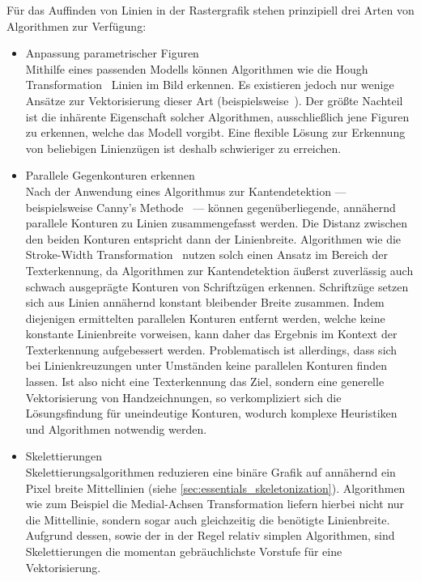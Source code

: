 \clearpage
Für das Auffinden von Linien in der Rastergrafik stehen prinzipiell drei Arten von Algorithmen zur Verfügung:
\begin{itemize}
    \item Anpassung parametrischer Figuren \\
    Mithilfe eines passenden Modells können Algorithmen wie die Hough Transformation~\cite{DBLP:journals/cacm/DudaH72} Linien im Bild erkennen.
    Es existieren jedoch nur wenige Ansätze zur Vektorisierung dieser Art (beispielsweise~\cite{DBLP:journals/pr/SongL05}).
    Der größte Nachteil ist die inhärente Eigenschaft solcher Algorithmen, ausschließlich jene Figuren zu erkennen, welche das Modell vorgibt.
    Eine flexible Lösung zur Erkennung von beliebigen Linienzügen ist deshalb schwieriger zu erreichen.
    \item Parallele Gegenkonturen erkennen \\
    Nach der Anwendung eines Algorithmus zur Kantendetektion --- beispielsweise Canny's Methode~\cite{DBLP:journals/pami/Canny86a} --- können gegenüberliegende, annähernd parallele Konturen zu Linien zusammengefasst werden.
    Die Distanz zwischen den beiden Konturen entspricht dann der Linienbreite.
    Algorithmen wie die Stroke-Width Transformation~\cite{DBLP:conf/cvpr/EpshteinOW10} nutzen solch einen Ansatz im Bereich der Texterkennung, da Algorithmen zur Kantendetektion äußerst zuverlässig auch schwach ausgeprägte Konturen von Schriftzügen erkennen.
    Schriftzüge setzen sich aus Linien annähernd konstant bleibender Breite zusammen.
    Indem diejenigen ermittelten parallelen Konturen entfernt werden, welche keine konstante Linienbreite vorweisen, kann daher das Ergebnis im Kontext der Texterkennung aufgebessert werden.
    Problematisch ist allerdings, dass sich bei Linienkreuzungen unter Umständen keine parallelen Konturen finden lassen.
    Ist also nicht eine Texterkennung das Ziel, sondern eine generelle Vektorisierung von Handzeichnungen, so verkompliziert sich die Lösungsfindung für uneindeutige Konturen, wodurch komplexe Heuristiken und Algorithmen notwendig werden.
    \item Skelettierungen \\
    Skelettierungsalgorithmen reduzieren eine binäre Grafik auf annähernd ein Pixel breite Mittellinien (siehe \autoref{sec:essentials_skeletonization}).
    Algorithmen wie zum Beispiel die Medial-Achsen Transformation liefern hierbei nicht nur die Mittellinie, sondern sogar auch gleichzeitig die benötigte Linienbreite.
    Aufgrund dessen, sowie der in der Regel relativ simplen Algorithmen, sind Skelettierungen die momentan gebräuchlichste Vorstufe für eine Vektorisierung.

\end{itemize}
